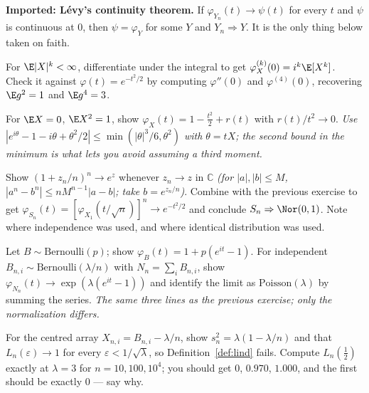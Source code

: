 \documentclass[11pt]{article}
\newcommand{\Poi}{\mathrm{Poisson}}
\newcommand{\Ber}{\mathrm{Bernoulli}}
\begin{document}
\begin{imported}
\textbf{Imported: L\'evy's continuity theorem.} If $\varphi_{Y_n}(t)\to\psi(t)$ for every $t$ and $\psi$ is continuous at $0$, then $\psi=\varphi_Y$ for some $Y$ and $Y_n\Rightarrow Y$. It is the only thing below taken on faith.
\end{imported}

\begin{exercise}[\ty{A}]
For $\E|X|^k<\infty$, differentiate under the integral to get $\varphi_X^{(k)}(0)=i^k\E[X^k]$. Check it against $\varphi(t)=e^{-t^2/2}$ by computing $\varphi''(0)$ and $\varphi^{(4)}(0)$, recovering $\E g^2=1$ and $\E g^4=3$.
\end{exercise}

\begin{exercise}[\ty{B}]
For $\E X=0$, $\E X^2=1$, show $\varphi_X(t)=1-\tfrac{t^2}{2}+r(t)$ with $r(t)/t^2\to0$. \emph{Use $|e^{i\theta}-1-i\theta+\theta^2/2|\le\min(|\theta|^3/6,\theta^2)$ with $\theta=tX$; the second bound in the minimum is what lets you avoid assuming a third moment.}
\end{exercise}

\begin{exercise}[\ty{B}]
Show $(1+z_n/n)^n\to e^z$ whenever $z_n\to z$ in $\mathbb{C}$ \emph{(for $|a|,|b|\le M$, $|a^n-b^n|\le nM^{n-1}|a-b|$; take $b=e^{z_n/n}$)}. Combine with the previous exercise to get $\varphi_{S_n}(t)=[\varphi_{X_1}(t/\sqrt n)]^n\to e^{-t^2/2}$ and conclude $S_n\Rightarrow\Nor(0,1)$. Note where independence was used, and where identical distribution was used.
\end{exercise}

\begin{exercise}[\ty{A}]
Let $B\sim\Ber(p)$; show $\varphi_B(t)=1+p(e^{it}-1)$. For independent $B_{n,i}\sim\Ber(\lambda/n)$ with $N_n=\sum_iB_{n,i}$, show $\varphi_{N_n}(t)\to\exp(\lambda(e^{it}-1))$ and identify the limit as $\Poi(\lambda)$ by summing the series. \emph{The same three lines as the previous exercise; only the normalization differs.}
\end{exercise}

\begin{exercise}[\ty{B}]
For the centred array $X_{n,i}=B_{n,i}-\lambda/n$, show $s_n^2=\lambda(1-\lambda/n)$ and that $L_n(\varepsilon)\to1$ for every $\varepsilon<1/\sqrt\lambda$, so Definition~\ref{def:lind} fails. Compute $L_n(\tfrac12)$ exactly at $\lambda=3$ for $n=10,100,10^4$; you should get $0$, $0.970$, $1.000$, and the first should be exactly $0$ --- say why.
\end{exercise}
\end{document}
